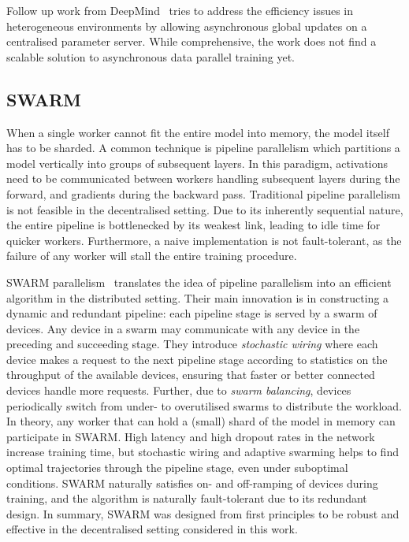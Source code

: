 \documentclass{article}
\begin{document}
Follow up work from DeepMind~\cite{li2024} tries to address the efficiency
issues in heterogeneous environments by allowing asynchronous global updates on
a centralised parameter server. While comprehensive, the work does not find a
scalable solution to asynchronous data parallel training yet.

\subsection{SWARM}

When a single worker cannot fit the entire model into memory, the model itself
has to be sharded. A common technique is pipeline parallelism which partitions a
model vertically into groups of subsequent layers. In this paradigm, activations
need to be communicated between workers handling subsequent layers during the
forward, and gradients during the backward pass. Traditional pipeline
parallelism is not feasible in the decentralised setting. Due to its inherently
sequential nature, the entire pipeline is bottlenecked by its weakest link,
leading to idle time for quicker workers. Furthermore, a naive implementation is
not fault-tolerant, as the failure of any worker will stall the entire training
procedure.

SWARM parallelism~\cite{ryabinin2023} translates the idea of pipeline
parallelism into an efficient algorithm in the distributed setting. Their main
innovation is in constructing a dynamic and redundant pipeline: each pipeline
stage is served by a swarm of devices. Any device in a swarm may communicate
with any device in the preceding and succeeding stage. They introduce
\textit{stochastic wiring} where each device makes a request to the next
pipeline stage according to statistics on the throughput of the available
devices, ensuring that faster or better connected devices handle more requests.
Further, due to \textit{swarm balancing}, devices periodically switch from
under- to overutilised swarms to distribute the workload. In theory, any worker
that can hold a (small) shard of the model in memory can participate in SWARM. 
High latency and high dropout rates in the network increase training time, but 
stochastic wiring and adaptive swarming helps to find optimal trajectories
through the pipeline stage, even under suboptimal conditions. SWARM naturally
satisfies on- and off-ramping of devices during training, and the algorithm is
naturally fault-tolerant due to its redundant design. In summary, SWARM was
designed from first principles to be robust and effective in the decentralised
setting considered in this work.
\end{document}

